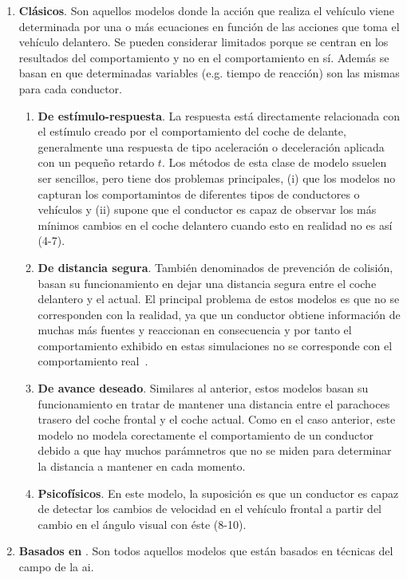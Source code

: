 \begin{enumerate}
	\item \textbf{Clásicos}. Son aquellos modelos donde la acción que realiza el vehículo viene determinada por una o más ecuaciones en función de las acciones que toma el vehículo delantero. Se pueden considerar limitados porque se centran en los resultados del comportamiento y no en el comportamiento en sí. Además se basan en que determinadas variables (e.g. tiempo de reacción) son las mismas para cada conductor.
	\begin{enumerate}
		\item \textbf{De estímulo-respuesta}. La respuesta está directamente relacionada con el estímulo creado por el comportamiento del coche de delante, generalmente una respuesta de tipo aceleración o deceleración aplicada con un pequeño retardo $t$. Los métodos de esta clase de modelo ssuelen ser sencillos, pero tiene dos problemas principales, (i) que los modelos no capturan los comportamintos de diferentes tipos de conductores o vehículos y (ii) supone que el conductor es capaz de observar los más mínimos cambios en el coche delantero cuando esto en realidad no es así (4-7).
		\item \textbf{De distancia segura}. También denominados de prevención de colisión, basan su funcionamiento en dejar una distancia segura entre el coche delantero y el actual. El principal problema de estos modelos es que no se corresponden con la realidad, ya que un conductor obtiene información de muchas más fuentes y reaccionan en consecuencia y por tanto el comportamiento exhibido en estas simulaciones no se corresponde con el comportamiento real~\cite{Pipes1953}.
		\item \textbf{De avance deseado}. Similares al anterior, estos modelos basan su funcionamiento en tratar de mantener una distancia entre el parachoces trasero del coche frontal y el coche actual. Como en el caso anterior, este modelo no modela corectamente el comportamiento de un conductor debido a que hay muchos parámnetros que no se miden para determinar la distancia a mantener en cada momento.
		\item \textbf{Psicofísicos}. En este modelo, la suposición es que un conductor es capaz de detectar los cambios de velocidad en el vehículo frontal a partir del cambio en el ángulo visual con éste (8-10).
	\end{enumerate}
	\item \textbf{Basados en }. Son todos aquellos modelos que están basados en técnicas del campo de la \acrshort{ai}.
\end{enumerate}

